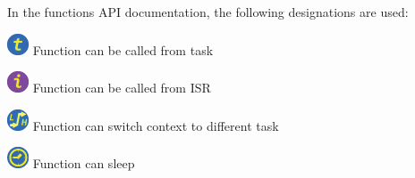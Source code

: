 In the functions A\+P\+I documentation, the following designations are used\+:


\begin{DoxyItemize}
\item   \includegraphics{attr_call_task.png}  Function can be called from task
\item   \includegraphics{attr_call_int.png}  Function can be called from I\+S\+R
\item   \includegraphics{attr_call_ct_sw.png}  Function can switch context to different task
\item   \includegraphics{attr_timeout.png}  Function can sleep 
\end{DoxyItemize}